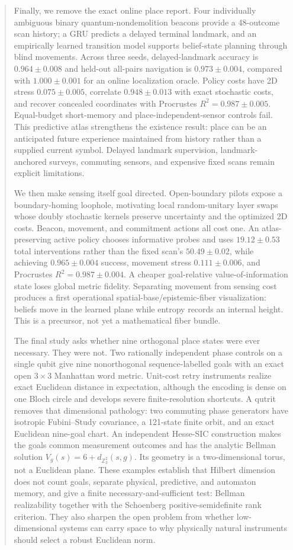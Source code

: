 \documentclass[11pt]{article}
\begin{document}
\begin{abstract}
Finally, we remove the exact online place report. Four individually ambiguous
binary quantum-nondemolition beacons provide a 48-outcome scan history; a GRU
predicts a delayed terminal landmark, and an empirically learned transition
model supports belief-state planning through blind movements. Across three
seeds, delayed-landmark accuracy is $0.964\pm0.008$ and held-out all-pairs
navigation is $0.973\pm0.004$, compared with $1.000\pm0.001$ for an online
localization oracle. Policy costs have 2D stress $0.075\pm0.005$, correlate
$0.948\pm0.013$ with exact stochastic costs, and recover concealed coordinates
with Procrustes $R^2=0.987\pm0.005$. Equal-budget short-memory and
place-independent-sensor controls fail. This predictive atlas strengthens the
existence result: place can be an anticipated future experience maintained
from history rather than a supplied current symbol. Delayed landmark
supervision, landmark-anchored surveys, commuting sensors, and expensive fixed
scans remain explicit limitations.

We then make sensing itself goal directed. Open-boundary pilots expose a
boundary-homing loophole, motivating local random-unitary layer swaps whose
doubly stochastic kernels preserve uncertainty and the optimized 2D costs.
Beacon, movement, and commitment actions all cost one. An atlas-preserving
active policy chooses informative probes and uses $19.12\pm0.53$ total
interventions rather than the fixed scan's $50.49\pm0.02$, while achieving
$0.965\pm0.004$ success, movement stress $0.111\pm0.006$, and Procrustes
$R^2=0.987\pm0.004$. A cheaper goal-relative value-of-information state loses
global metric fidelity. Separating movement from sensing cost produces a first
operational spatial-base/epistemic-fiber visualization: beliefs move in the
learned plane while entropy records an internal height. This is a precursor,
not yet a mathematical fiber bundle.

The final study asks whether nine orthogonal place states were ever necessary.
They were not. Two rationally independent phase controls on a single qubit
give nine nonorthogonal sequence-labelled goals with an exact open
$3\times3$ Manhattan word metric. Unit-cost retry instruments realize exact
Euclidean distance in expectation, although the encoding is dense on one
Bloch circle and develops severe finite-resolution shortcuts. A qutrit removes
that dimensional pathology: two commuting phase generators have isotropic
Fubini--Study covariance, a 121-state finite orbit, and an exact Euclidean
nine-goal chart. An independent Hesse-SIC construction makes the goals common
measurement outcomes and has the analytic Bellman solution
$V_g(s)=6+d_{\mathbb Z_3^2}(s,g)$. Its geometry is a two-dimensional torus,
not a Euclidean plane. These examples establish that Hilbert dimension does
not count goals, separate physical, predictive, and automaton memory, and give
a finite necessary-and-sufficient test: Bellman realizability together with
the Schoenberg positive-semidefinite rank criterion. They also sharpen the
open problem from whether low-dimensional systems can carry space to why
physically natural instruments should select a robust Euclidean norm.
\end{abstract}
\end{document}
